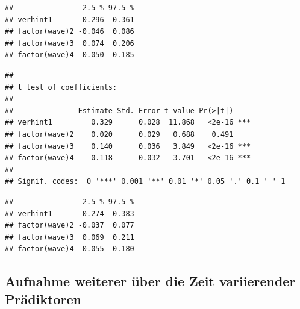 \documentclass[]{book}
\newenvironment{Shaded}{\begin{snugshade}}{\end{snugshade}}
\newcommand{\CommentTok}[1]{\textcolor[rgb]{0.56,0.35,0.01}{\textit{#1}}}
\newcommand{\DataTypeTok}[1]{\textcolor[rgb]{0.13,0.29,0.53}{#1}}
\newcommand{\DecValTok}[1]{\textcolor[rgb]{0.00,0.00,0.81}{#1}}
\newcommand{\KeywordTok}[1]{\textcolor[rgb]{0.13,0.29,0.53}{\textbf{#1}}}
\newcommand{\NormalTok}[1]{#1}
\newcommand{\OperatorTok}[1]{\textcolor[rgb]{0.81,0.36,0.00}{\textbf{#1}}}
\newcommand{\StringTok}[1]{\textcolor[rgb]{0.31,0.60,0.02}{#1}}
\begin{document}
\begin{verbatim}
##                2.5 % 97.5 %
## verhint1       0.296  0.361
## factor(wave)2 -0.046  0.086
## factor(wave)3  0.074  0.206
## factor(wave)4  0.050  0.185
\end{verbatim}

\begin{Shaded}
\end{Shaded}

\begin{verbatim}
## 
## t test of coefficients:
## 
##               Estimate Std. Error t value Pr(>|t|)    
## verhint1         0.329      0.028  11.868   <2e-16 ***
## factor(wave)2    0.020      0.029   0.688    0.491    
## factor(wave)3    0.140      0.036   3.849   <2e-16 ***
## factor(wave)4    0.118      0.032   3.701   <2e-16 ***
## ---
## Signif. codes:  0 '***' 0.001 '**' 0.01 '*' 0.05 '.' 0.1 ' ' 1
\end{verbatim}

\begin{Shaded}
\end{Shaded}

\begin{verbatim}
##                2.5 % 97.5 %
## verhint1       0.274  0.383
## factor(wave)2 -0.037  0.077
## factor(wave)3  0.069  0.211
## factor(wave)4  0.055  0.180
\end{verbatim}

\hypertarget{aufnahme-weiterer-uxfcber-die-zeit-variierender-pruxe4diktoren}{%
\subsection*{Aufnahme weiterer über die Zeit variierender Prädiktoren}\label{aufnahme-weiterer-uxfcber-die-zeit-variierender-pruxe4diktoren}}
\end{document}

